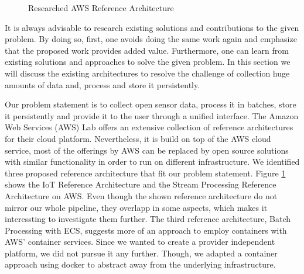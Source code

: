 \begin{figure}%
	\centering
	\caption{Researched AWS Reference Architecture}%
	\label{fig:aws-refarch}%
\end{figure}

It is always advisable to research existing solutions and contributions to the given problem. By doing so, first, one avoids doing the same work again and emphasize that the proposed work provides added value. Furthermore, one can learn from existing solutions and approaches to solve the given problem. In this section we will discuss the existing architectures to resolve the challenge of collection huge amounts of data and, process and store it persistently.

Our problem statement is to collect open sensor data, process it in batches, store it persistently and provide it to the user through a unified interface. The Amazon Web Services (AWS) Lab offers an extensive collection of reference architectures for their cloud platform. Nevertheless, it is build on top of the AWS cloud service, most of the offerings by AWS can be replaced by open source solutions with similar functionality in order to run on different infrastructure. We identified three proposed reference architecture that fit our problem statement. Figure \ref{fig:aws-refarch} shows the IoT Reference Architecture and the Stream Processing Reference Architecture on AWS. Even though the shown reference architecture do not mirror our whole pipeline, they overlapp in some aspects, which makes it interessting to investigate them further. The third reference architecture, Batch Processing with ECS, suggests more of an approach to employ containers with AWS' container services. Since we wanted to create a provider independent platform, we did not pursue it any further. Though, we adapted a container approach using docker to abstract away from the underlying infrastructure.

